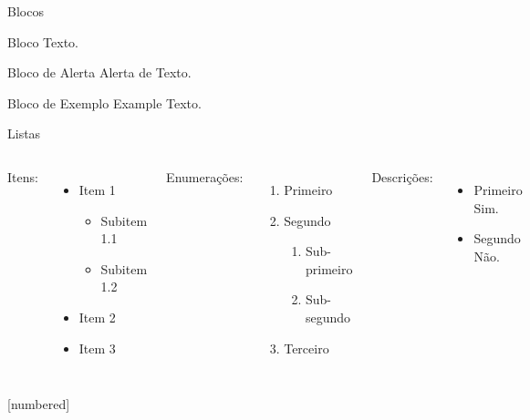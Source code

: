 \documentclass[aspectratio=169]{beamer}
\begin{document}
\begin{frame}{Blocos}
	\begin{block}{Bloco}
		Texto.
	\end{block}
	\pause
	\begin{alertblock}{Bloco de Alerta}
		Alerta de \alert{Texto}.
	\end{alertblock}
	\pause
	\begin{exampleblock}{Bloco de Exemplo}
		Example \textcolor{example}{Texto}.
	\end{exampleblock}
\end{frame}
\begin{frame}{Listas}
	\begin{columns}[t, onlytextwidth]
		Itens:
		\begin{itemize}
			\item Item 1
			\begin{itemize}
				\item Subitem 1.1
				\item Subitem 1.2
			\end{itemize}
			\item Item 2
			\item Item 3
		\end{itemize}
		
		Enumerações:
		\begin{enumerate}
			\item Primeiro
			\item Segundo
			\begin{enumerate}
				\item Sub-primeiro
				\item Sub-segundo
			\end{enumerate}
			\item Terceiro
		\end{enumerate}
		
		Descrições:
		\begin{itemize}
			\item Primeiro \textcolor{example}{Sim}.
			\item Segundo \alert{Não}.
		\end{itemize}
	\end{columns}
\end{frame}
[numbered]
\end{document}
